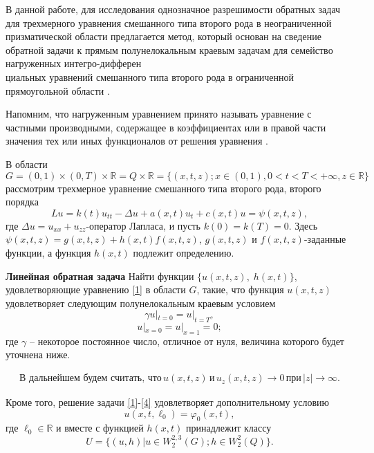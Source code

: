 В данной работе, для исследования однозначное разрешимости обратных задач для трехмерного уравнения смешанного типа второго рода в неограниченной призматической области предлагается метод, который основан на сведение обратной задачи к прямым полунелокальным краевым задачам для  семейство нагруженных интегро-дифферен \\циальных уравнений смешанного типа второго рода в ограниченной прямоугольной области \cite{Dzhamalov1,Dzhamalov2,Dzhamalov3}.

Напомним, что нагруженным уравнением принято называть уравнение с частными производными, содержащее в коэффициентах или в правой части значения тех или иных функционалов от решения уравнения \cite{Nakhushev}.

В области
$$G=(0,1)\times (0,T)\times \mathbb{R}=Q\times \mathbb{R}=\{(x,t,z);x\in (0,1),0<t<T<+\infty , z\in \mathbb{R}\}$$
рассмотрим трехмерное уравнение смешанного типа второго рода, второго порядка
 \begin{equation}\label{1}
Lu=k(t)u_{tt}-\Delta u +a(x,t)u_{t}+ c(x,t)u=\psi (x,t,z),
 \end{equation}
где $\Delta u=u_{xx}+u_{zz}$-оператор Лапласа, и пусть  $k(0)=k(T)=0$. Здесь $\psi (x,t,z)=g(x,t,z)+h(x,t)f(x,t,z)$,  $g(x,t,z)$ и $f(x,t,z)$-заданные функции, а функция  $h(x,t)$ подлежит определению.

{\bf Линейная обратная задача} Найти функции $\{u(x,t,z),\; h(x,t)\}$, удовлетворяющие уравнению \eqref{1} в области $G$, такие, что функция $u(x,t,z)$  удовлетворяет следующим полунелокальным краевым условием
\begin{equation} \label{2}
\gamma u|_{t=0}= u|_{t=T},
\end{equation}
\begin{equation} \label{3}
u|_{x=0}=  u|_{x=1}=0;
\end{equation}
где $\gamma $ -- некоторое постоянное число, отличное от нуля,  величина которого будет уточнена ниже.

\begin{equation} \label{4}
\begin{array}{c}
\text{В дальнейшем будем считать, что}\, u(x,t,z)\, \text{и}\, u_{z}(x,t,z)\rightarrow 0 \,  \text{при} \, \left|z\right|\rightarrow \infty.
\end{array}
\end{equation}

Кроме того, решение задачи \eqref{1}-\eqref{4}  удовлетворяет дополнительному условию
\begin{equation} \label{5}
u(x,t,\ell_{0})=\varphi _{0}(x,t),
\end{equation}
где $\ell_{0}\in \mathbb{R}$ и вместе с функцией  $h(x,t)$ принадлежит классу
$$U=\{(u,h)|u\in W_{2}^{2,3}(G);h\in W_{2}^{2}(Q)\}.$$

